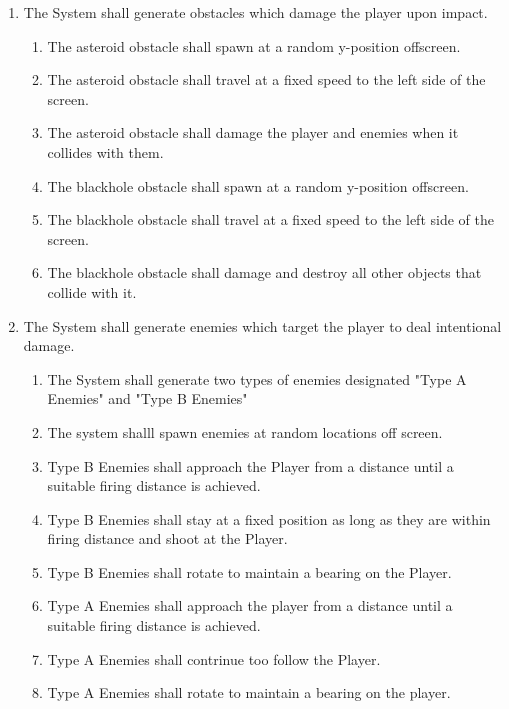 \documentclass[12pt]{report}
\newenvironment{reqlist}{
	\renewcommand{\labelenumi}{\tab\thesubsection.\arabic{enumi}}
	\renewcommand{\labelenumii}{\thesubsection.\arabic{enumi}.\arabic{enumii}}
	\begin{enumerate}[itemsep = 1pt, parsep = 0pt, leftmargin = *]
}{\end{enumerate}}
\begin{document}
\begin{reqlist}
\begin{reqlist}
				\item The System shall include a minimum of two alternative weapons in addition to the standard laser.
				\item The System shall make the additional weapons available in the in-game store.
			\end{reqlist}
			\item The System shall generate obstacles which damage the player upon impact.
			\begin{reqlist}
				\item The asteroid obstacle shall spawn at a random y-position offscreen.
				\item The asteroid obstacle shall travel at a fixed speed to the left side of the screen.
				\item The asteroid obstacle shall damage the player and enemies when it collides with them.
				\item The blackhole obstacle shall spawn at a random y-position offscreen.
				\item The blackhole obstacle shall travel at a fixed speed to the left side of the screen.
				\item The blackhole obstacle shall damage and destroy all other objects that collide with it.
			\end{reqlist}
			\item The System shall generate enemies which target the player to deal intentional damage.
			\begin{reqlist}
				\item The System shall generate two types of enemies designated "Type A Enemies" and "Type B Enemies"
				\item The system shalll spawn enemies at random locations off screen.
				\item Type B Enemies shall approach the Player from a distance until a suitable firing distance is achieved.
				\item Type B Enemies shall stay at a fixed position as long as they are within firing distance and shoot at the Player.
				\item Type B Enemies shall rotate to maintain a bearing on the Player.
				\item Type A Enemies shall approach the player from a distance until a suitable firing distance is achieved.
				\item Type A Enemies shall contrinue too follow the Player.
				\item Type A Enemies shall rotate to maintain a bearing on the player.

\end{reqlist}
\end{reqlist}
\end{document}
